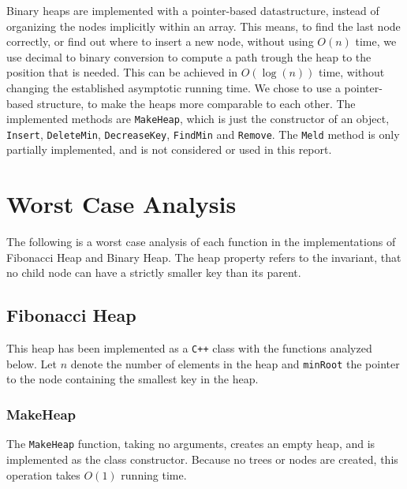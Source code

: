 \documentclass[a4paper,10pt]{article}
\begin{document}
Binary heaps are implemented with a pointer-based datastructure, instead of organizing the nodes implicitly within an array. This means, to find the last node correctly, or find out where to insert a new node, without using $O(n)$ time, we use decimal to binary conversion to compute a path trough the heap to the position that is needed. This can be achieved in $O(\log(n))$ time, without changing the established asymptotic running time. We chose to use a pointer-based structure, to make the heaps more comparable to each other.
The implemented methods are \texttt{MakeHeap}, which is just the constructor of an object, \texttt{Insert}, \texttt{DeleteMin}, \texttt{DecreaseKey}, \texttt{FindMin} and \texttt{Remove}. The \texttt{Meld} method is only partially implemented, and is not considered or used in this report.%

\section{Worst Case Analysis}
The following is a worst case analysis of each function in the implementations of Fibonacci Heap and Binary Heap.
The heap property refers to the invariant, that no child node can have a strictly smaller key than its parent.
\subsection{Fibonacci Heap}
This heap has been implemented as a \texttt{C++} class with the functions analyzed below. Let $n$ denote the number of elements in the heap and \texttt{minRoot} the pointer to the node containing the smallest key in the heap. %
\subsubsection*{MakeHeap}
The \texttt{MakeHeap} function, taking no arguments, creates an empty heap, and is implemented as the class constructor. Because no trees or nodes are created, this operation takes $O(1)$ running time.
\end{document}
